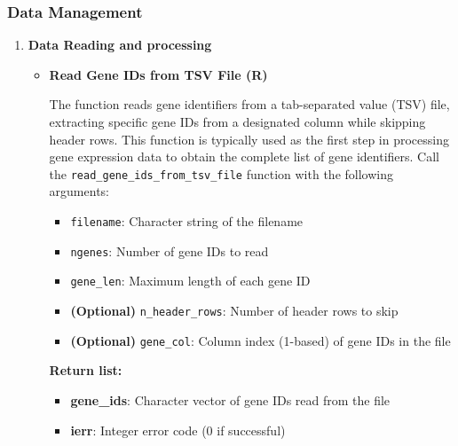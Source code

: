 \documentclass[11pt]{article}
\begin{document}
\subsubsection{Data Management}
\begin{enumerate}
	\item \textbf{Data Reading and processing}
	      
	      \begin{itemize}
	      	\item \textbf{Read Gene IDs from TSV File (R)}
	      	      
	      	      The function reads gene identifiers from a tab-separated value (TSV) file,
	      	      extracting specific gene IDs from a designated column while skipping
	      	      header rows. This function is typically used as the first step in processing
	      	      gene expression data to obtain the complete list of gene identifiers. Call
	      	      the \texttt{read\_gene\_ids\_from\_tsv\_file} function with the following arguments:
	      	      
	      	      \begin{itemize}
	      	      	\item \texttt{filename}: Character string of the filename
	      	      	      
	      	      	\item \texttt{ngenes}: Number of gene IDs to read
	      	      	      
	      	      	\item \texttt{gene\_len}: Maximum length of each gene ID
	      	      	      
	      	      	\item \textbf{(Optional)} \texttt{n\_header\_rows}: Number of header
	      	      	      rows to skip
	      	      	      
	      	      	\item \textbf{(Optional)} \texttt{gene\_col}: Column index (1-based) of
	      	      	      gene IDs in the file
	      	      \end{itemize}
	      	      
	      	      \textbf{Return list:}
	      	      \begin{itemize}
	      	      	\item \textbf{gene\_ids}: Character vector of gene IDs read from the file
	      	      	      
	      	      	\item \textbf{ierr}: Integer error code (0 if successful)
	      	      \end{itemize}
	      	      

\end{itemize}
\end{enumerate}
\end{document}
